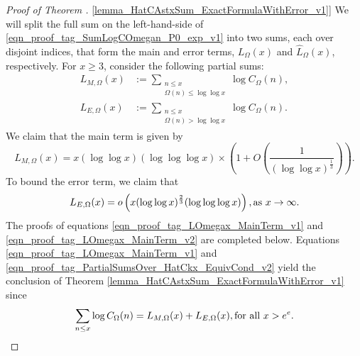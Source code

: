 \documentclass[11pt,reqno,a4letter]{article}
\newcommand{\hlocalref}[1]{\hyperref[#1]{\ref{#1}}}
\numberwithin{equation}{section}
\numberwithin{figure}{section}
\numberwithin{table}{section}
\theoremstyle{plain}
\numberwithin{theorem}{section}
\theoremstyle{definition}
\theoremstyle{remark}
\newcommand{\mathtext}[1]{\text{\rm #1}}
\begin{document}
\begin{proof}[Proof of Theorem \hlocalref{lemma_HatCAstxSum_ExactFormulaWithError_v1}]  
We will split the full sum on the left-hand-side of 
\eqref{eqn_proof_tag_SumLogCOmegan_P0_exp_v1} into two sums, 
each over disjoint indices, that form the main and error terms, 
$L_{\Omega}(x)$ and $\widehat{L}_{\Omega}(x)$, respectively.
For $x \geq 3$, consider the following partial sums:
\begin{align*}
L_{M,\Omega}(x) & := 
	\sum_{\substack{n \leq x \\ \Omega(n) \leq \log\log x}} \log C_{\Omega}(n), \\ 
L_{E,\Omega}(x) & := 
	\sum_{\substack{n \leq x \\ \Omega(n) >\log\log x}} 
	\log C_{\Omega}(n).
\end{align*}
We claim that the main term is given by 
\begin{equation}
\label{eqn_proof_tag_LOmegax_MainTerm_v1}
L_{M,\Omega}(x) = 
	x (\log\log x)(\log\log\log x) \times \left(1 + 
     O\left(\frac{1}{(\log\log x)^{\frac{1}{3}}}\right)\right).
\end{equation}
To bound the error term, we claim that 
\begin{equation}
\label{eqn_proof_tag_PartialSumsOver_HatCkx_EquivCond_v2}
L_{E,\Omega}(x) = o\left(x (\log\log x)^{\frac{2}{3}} (\log\log\log x)\right), 
     \mathtext{ as } x \rightarrow \infty. 
\end{equation}
The proofs of equations \eqref{eqn_proof_tag_LOmegax_MainTerm_v1} and 
\eqref{eqn_proof_tag_LOmegax_MainTerm_v2} are completed below. 
Equations \eqref{eqn_proof_tag_LOmegax_MainTerm_v1} and 
\eqref{eqn_proof_tag_PartialSumsOver_HatCkx_EquivCond_v2} 
yield the conclusion of 
Theorem \hlocalref{lemma_HatCAstxSum_ExactFormulaWithError_v1} since 
\[
\sum_{n \leq x} \log C_{\Omega}(n) = L_{M,\Omega}(x) + L_{E,\Omega}(x), 
     \mathtext{ for all } x > e^e. 
     \qedhere
\]
\end{proof}
\end{document}
